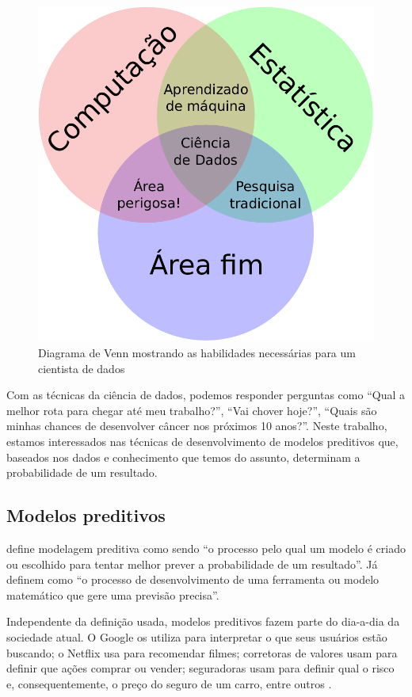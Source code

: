 \documentclass[a4paper,titlepage]{ppgi}\usepackage[]{graphicx}\usepackage[]{color}
\begin{document}
\begin{figure}[h]
\includegraphics{ciencia-de-dados-diagrama-venn}
\caption{Diagrama de Venn mostrando as habilidades necessárias para um
cientista de dados}
\label{fig:ciencia-de-dados-venn}
\end{figure}

Com as técnicas da ciência de dados, podemos responder perguntas como ``Qual a
melhor rota para chegar até meu trabalho?'', ``Vai chover hoje?'', ``Quais são
minhas chances de desenvolver câncer nos próximos 10 anos?''. Neste trabalho,
estamos interessados nas técnicas de desenvolvimento de modelos preditivos que,
baseados nos dados e conhecimento que temos do assunto, determinam a
probabilidade de um resultado.

\subsection{Modelos preditivos}

 define modelagem preditiva como sendo ``o processo
pelo qual um modelo é criado ou escolhido para tentar melhor prever a
probabilidade de um resultado''. Já  definem como ``o
processo de desenvolvimento de uma ferramenta ou modelo matemático que gere uma
previsão precisa''.

Independente da definição usada, modelos preditivos fazem parte do dia-a-dia da
sociedade atual. O Google os utiliza para interpretar o que seus usuários estão
buscando; o Netflix usa para recomendar filmes; corretoras de valores usam para
definir que ações comprar ou vender; seguradoras usam para definir qual o risco
e, consequentemente, o preço do seguro de um carro, entre outros
\cite{Levy2010}.
\end{document}
